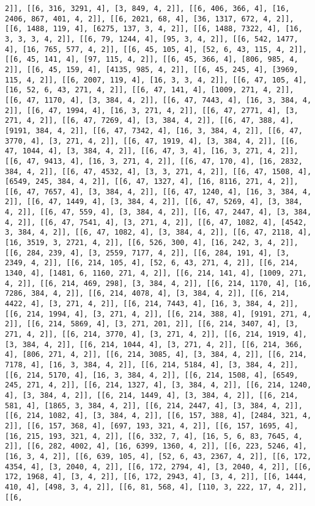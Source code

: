 \documentclass[12pt,fleqn]{article}\usepackage{../../common}
\begin{document}
\begin{verbatim}
2]], [[6, 316, 3291, 4], [3, 849, 4, 2]], [[6, 406, 366, 4], [16, 2406, 867, 401, 4, 2]], [[6, 2021, 68, 4], [36, 1317, 672, 4, 2]], [[6, 1488, 119, 4], [6275, 137, 3, 4, 2]], [[6, 1488, 7322, 4], [16, 3, 3, 3, 4, 2]], [[6, 79, 1244, 4], [95, 3, 4, 2]], [[6, 542, 1477, 4], [16, 765, 577, 4, 2]], [[6, 45, 105, 4], [52, 6, 43, 115, 4, 2]], [[6, 45, 141, 4], [97, 115, 4, 2]], [[6, 45, 366, 4], [806, 985, 4, 2]], [[6, 45, 159, 4], [4135, 985, 4, 2]], [[6, 45, 245, 4], [3969, 115, 4, 2]], [[6, 2007, 119, 4], [16, 3, 3, 4, 2]], [[6, 47, 105, 4], [16, 52, 6, 43, 271, 4, 2]], [[6, 47, 141, 4], [1009, 271, 4, 2]], [[6, 47, 1170, 4], [3, 384, 4, 2]], [[6, 47, 7443, 4], [16, 3, 384, 4, 2]], [[6, 47, 1994, 4], [16, 3, 271, 4, 2]], [[6, 47, 2771, 4], [3, 271, 4, 2]], [[6, 47, 7269, 4], [3, 384, 4, 2]], [[6, 47, 388, 4], [9191, 384, 4, 2]], [[6, 47, 7342, 4], [16, 3, 384, 4, 2]], [[6, 47, 3770, 4], [3, 271, 4, 2]], [[6, 47, 1919, 4], [3, 384, 4, 2]], [[6, 47, 1044, 4], [3, 384, 4, 2]], [[6, 47, 3, 4], [16, 3, 271, 4, 2]], [[6, 47, 9413, 4], [16, 3, 271, 4, 2]], [[6, 47, 170, 4], [16, 2832, 384, 4, 2]], [[6, 47, 4532, 4], [3, 3, 271, 4, 2]], [[6, 47, 1508, 4], [6549, 245, 384, 4, 2]], [[6, 47, 1327, 4], [16, 8116, 271, 4, 2]], [[6, 47, 7657, 4], [3, 384, 4, 2]], [[6, 47, 1240, 4], [16, 3, 384, 4, 2]], [[6, 47, 1449, 4], [3, 384, 4, 2]], [[6, 47, 5269, 4], [3, 384, 4, 2]], [[6, 47, 559, 4], [3, 384, 4, 2]], [[6, 47, 2447, 4], [3, 384, 4, 2]], [[6, 47, 7541, 4], [3, 271, 4, 2]], [[6, 47, 1082, 4], [4542, 3, 384, 4, 2]], [[6, 47, 1082, 4], [3, 384, 4, 2]], [[6, 47, 2118, 4], [16, 3519, 3, 2721, 4, 2]], [[6, 526, 300, 4], [16, 242, 3, 4, 2]], [[6, 284, 239, 4], [3, 2559, 7177, 4, 2]], [[6, 284, 191, 4], [3, 2349, 4, 2]], [[6, 214, 105, 4], [52, 6, 43, 271, 4, 2]], [[6, 214, 1340, 4], [1481, 6, 1160, 271, 4, 2]], [[6, 214, 141, 4], [1009, 271, 4, 2]], [[6, 214, 469, 298], [3, 384, 4, 2]], [[6, 214, 1170, 4], [16, 7286, 384, 4, 2]], [[6, 214, 4078, 4], [3, 384, 4, 2]], [[6, 214, 4422, 4], [3, 271, 4, 2]], [[6, 214, 7443, 4], [16, 3, 384, 4, 2]], [[6, 214, 1994, 4], [3, 271, 4, 2]], [[6, 214, 388, 4], [9191, 271, 4, 2]], [[6, 214, 5869, 4], [3, 271, 201, 2]], [[6, 214, 3407, 4], [3, 271, 4, 2]], [[6, 214, 3770, 4], [3, 271, 4, 2]], [[6, 214, 1919, 4], [3, 384, 4, 2]], [[6, 214, 1044, 4], [3, 271, 4, 2]], [[6, 214, 366, 4], [806, 271, 4, 2]], [[6, 214, 3085, 4], [3, 384, 4, 2]], [[6, 214, 7178, 4], [16, 3, 384, 4, 2]], [[6, 214, 5184, 4], [3, 384, 4, 2]], [[6, 214, 5170, 4], [16, 3, 384, 4, 2]], [[6, 214, 1508, 4], [6549, 245, 271, 4, 2]], [[6, 214, 1327, 4], [3, 384, 4, 2]], [[6, 214, 1240, 4], [3, 384, 4, 2]], [[6, 214, 1449, 4], [3, 384, 4, 2]], [[6, 214, 581, 4], [1865, 3, 384, 4, 2]], [[6, 214, 2447, 4], [3, 384, 4, 2]], [[6, 214, 1082, 4], [3, 384, 4, 2]], [[6, 157, 388, 4], [2484, 321, 4, 2]], [[6, 157, 368, 4], [697, 193, 321, 4, 2]], [[6, 157, 1695, 4], [16, 215, 193, 321, 4, 2]], [[6, 332, 7, 4], [16, 5, 6, 83, 7645, 4, 2]], [[6, 282, 4002, 4], [16, 6399, 1360, 4, 2]], [[6, 223, 5246, 4], [16, 3, 4, 2]], [[6, 639, 105, 4], [52, 6, 43, 2367, 4, 2]], [[6, 172, 4354, 4], [3, 2040, 4, 2]], [[6, 172, 2794, 4], [3, 2040, 4, 2]], [[6, 172, 1968, 4], [3, 4, 2]], [[6, 172, 2943, 4], [3, 4, 2]], [[6, 1444, 410, 4], [498, 3, 4, 2]], [[6, 81, 568, 4], [110, 3, 222, 17, 4, 2]], [[6, 
\end{verbatim}
\end{document}
